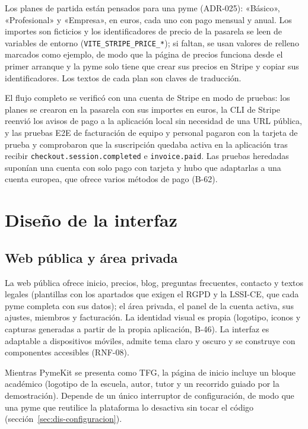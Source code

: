 Los planes de partida están pensados para una pyme (ADR-025): «Básico»,
«Profesional» y «Empresa», en euros, cada uno con pago mensual y anual. Los
importes son ficticios y los identificadores de precio de la pasarela se
leen de variables de entorno (\texttt{VITE\_STRIPE\_PRICE\_*}); si faltan,
se usan valores de relleno marcados como ejemplo, de modo que la página de
precios funciona desde el primer arranque y la pyme solo tiene que crear sus
precios en Stripe y copiar sus identificadores. Los textos de cada plan son
claves de traducción.

El flujo completo se verificó con una cuenta de Stripe en modo de pruebas:
los planes se crearon en la pasarela con sus importes en euros, la CLI de
Stripe reenvió los avisos de pago a la aplicación local sin necesidad de una
URL pública, y las pruebas E2E de facturación de equipo y personal pagaron
con la tarjeta de prueba y comprobaron que la suscripción quedaba activa en
la aplicación tras recibir \texttt{checkout.session.completed} e
\texttt{invoice.paid}. Las pruebas heredadas suponían una cuenta con solo
pago con tarjeta y hubo que adaptarlas a una cuenta europea, que ofrece
varios métodos de pago (B-62).

\section{Diseño de la interfaz}
\label{sec:dis-interfaz}

\subsection{Web pública y área privada}

La web pública ofrece inicio, precios, blog, preguntas frecuentes, contacto y
textos legales (plantillas con los apartados que exigen el RGPD y la LSSI-CE,
que cada pyme completa con sus datos); el área privada, el panel de la cuenta activa, sus ajustes,
miembros y facturación. La identidad visual es propia (logotipo, iconos y
capturas generadas a partir de la propia aplicación, B-46). La interfaz es
adaptable a dispositivos móviles, admite tema claro y oscuro y se construye
con componentes accesibles (RNF-08).

Mientras PymeKit se presenta como TFG, la página de inicio incluye un bloque
académico (logotipo de la escuela, autor, tutor y un recorrido guiado por la
demostración). Depende de un único interruptor de configuración, de modo que
una pyme que reutilice la plataforma lo desactiva sin tocar el código
(sección~\ref{sec:dis-configuracion}).

